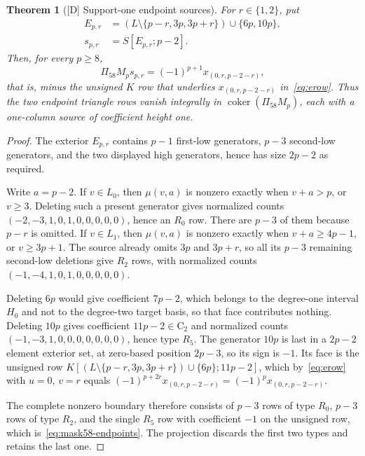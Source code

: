 \documentclass[11pt]{article}
\newtheorem{theorem}{Theorem}[section]
\theoremstyle{definition}
\theoremstyle{remark}
\newcommand{\coker}{\operatorname{coker}}
\begin{document}
\begin{theorem}[{[D]} Support-one endpoint sources]\label{thm:mask58-endpoints}
For $r\in\{1,2\}$, put
\begin{align*}
 E_{p,r}&=(L\setminus\{p-r,3p,3p+r\})\cup\{6p,10p\},\\
 s_{p,r}&=S[E_{p,r};p-2].
\end{align*}
Then, for every $p\geq8$,
\begin{equation}\label{eq:mask58-endpoints}
 \Pi_{58}M_ps_{p,r}=(-1)^{p+1}x_{(0,r,p-2-r)},
\end{equation}
that is, minus the unsigned $K$ row that underlies $x_{(0,r,p-2-r)}$ in~\eqref{eq:erow}.
Thus the two endpoint triangle rows vanish integrally in
$\coker(\Pi_{58}M_p)$, each with a one-column source of coefficient height one.
\end{theorem}
\begin{proof}
The exterior $E_{p,r}$ contains $p-1$ first-low generators, $p-3$
second-low generators, and the two displayed high generators, hence has
size $2p-2$ as required.

Write $a=p-2$. If $v\in L_0$, then $\mu(v,a)$ is nonzero exactly when
$v+a>p$, or $v\geq3$. Deleting such a present generator gives normalized
counts $(-2,-3,1,0,1,0,0,0,0,0)$, hence an $R_0$ row. There are $p-3$
of them because $p-r$ is omitted. If $v\in L_1$, then $\mu(v,a)$ is
nonzero exactly when $v+a\geq4p-1$, or $v\geq3p+1$. The source already
omits $3p$ and $3p+r$, so all its $p-3$ remaining second-low deletions
give $R_2$ rows, with normalized counts
$(-1,-4,1,0,1,0,0,0,0,0)$.

Deleting $6p$ would give coefficient $7p-2$, which belongs to the
degree-one interval $H_0$ and not to the degree-two target basis, so that
face contributes nothing. Deleting $10p$ gives coefficient $11p-2\in
\mathrm C_2$ and normalized counts
$(-1,-3,1,0,0,0,0,0,0,0)$, hence type $R_5$. The generator $10p$ is
last in a $2p-2$ element exterior set, at zero-based position $2p-3$,
so its sign is $-1$. Its face is the unsigned row
$K[(L\setminus\{p-r,3p,3p+r\})\cup\{6p\};11p-2]$, which by~\eqref{eq:erow} with $u=0$, $v=r$ equals
$(-1)^{p+2r}x_{(0,r,p-2-r)}=(-1)^p x_{(0,r,p-2-r)}$.

The complete nonzero boundary therefore consists of $p-3$ rows of type
$R_0$, $p-3$ rows of type $R_2$, and the single $R_5$ row with coefficient $-1$ on the
unsigned row, which is~\eqref{eq:mask58-endpoints}. The projection discards the first two types
and retains the last one.
\end{proof}
\end{document}
